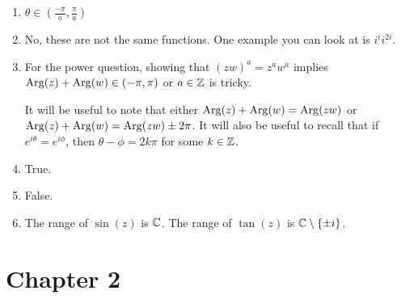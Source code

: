 \begin{enumerate}
\item $\theta \in \left(\frac{-\pi}{a}, \frac{\pi}{a}\right)$

\item No, these are not the same functions. One example you can look at is $i^{i}i^{2i}$.

\item For the power question, showing that $(zw)^a = z^aw^a$ implies $\mathrm{Arg}(z) + \mathrm{Arg}(w) \in (-\pi,\pi)$ or $a\in \mathbb{Z}$ is tricky. 

It will be useful to note that either $\mathrm{Arg}(z) + \mathrm{Arg}(w) = \mathrm{Arg}(zw)$ or $\mathrm{Arg}(z) + \mathrm{Arg}(w) = \mathrm{Arg}(zw) \pm 2\pi$. It will also be useful to recall that if $e^{i\theta} = e^{i\phi}$, then $\theta -\phi = 2k\pi$ for some $k\in\mathbb{Z}$.

\item True.

\item False.

\item The range of $\sin(z)$ is $\mathbb{C}$. The range of $\tan(z)$ is $\mathbb{C}\setminus\{\pm i\}$.

\end{enumerate}



\section{Chapter 2}

